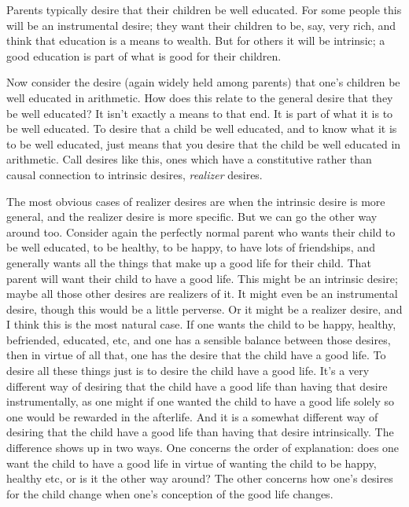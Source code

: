 \documentclass[
  10pt,
  letterpaper,
  twoside]{scrbook}
\begin{document}
Parents typically desire that their children be well educated. For some
people this will be an instrumental desire; they want their children to
be, say, very rich, and think that education is a means to wealth. But
for others it will be intrinsic; a good education is part of what is
good for their children.

Now consider the desire (again widely held among parents) that one's
children be well educated in arithmetic. How does this relate to the
general desire that they be well educated? It isn't exactly a means to
that end. It is part of what it is to be well educated. To desire that a
child be well educated, and to know what it is to be well educated, just
means that you desire that the child be well educated in arithmetic.
Call desires like this, ones which have a constitutive rather than
causal connection to intrinsic desires, \emph{realizer} desires.

The most obvious cases of realizer desires are when the intrinsic desire
is more general, and the realizer desire is more specific. But we can go
the other way around too. Consider again the perfectly normal parent who
wants their child to be well educated, to be healthy, to be happy, to
have lots of friendships, and generally wants all the things that make
up a good life for their child. That parent will want their child to
have a good life. This might be an intrinsic desire; maybe all those
other desires are realizers of it. It might even be an instrumental
desire, though this would be a little perverse. Or it might be a
realizer desire, and I think this is the most natural case. If one wants
the child to be happy, healthy, befriended, educated, etc, and one has a
sensible balance between those desires, then in virtue of all that, one
has the desire that the child have a good life. To desire all these
things just is to desire the child have a good life. It's a very
different way of desiring that the child have a good life than having
that desire instrumentally, as one might if one wanted the child to have
a good life solely so one would be rewarded in the afterlife. And it is
a somewhat different way of desiring that the child have a good life
than having that desire intrinsically. The difference shows up in two
ways. One concerns the order of explanation: does one want the child to
have a good life in virtue of wanting the child to be happy, healthy
etc, or is it the other way around? The other concerns how one's desires
for the child change when one's conception of the good life changes.
\end{document}
